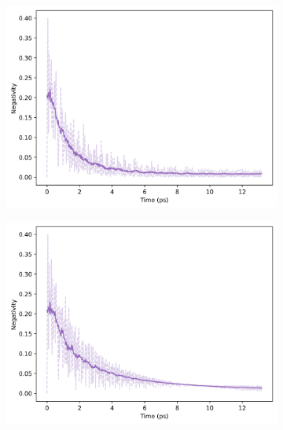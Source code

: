 \documentclass[11pt]{article}
\begin{document}
\begin{figure}[H]
    \centering
    \begin{subfigure}{0.45\textwidth}
        \centering
        \includegraphics[width=\linewidth]{Research Project/Code/results/ExVib/Open/Negativity/neg_spont_eg.png}
        \caption{}
        \label{fig:EVM_OQS_Neg_spont_eg}
    \end{subfigure}
    \hfill
    \begin{subfigure}{0.45\textwidth}
        \centering
        \includegraphics[width=\linewidth]{Research Project/Code/results/ExVib/Open/Negativity/neg_therm_eg.png}
        \caption{}
        \label{fig:EVM_OQS_Neg_therm_eg}
    \end{subfigure}
    

\end{figure}
\end{document}
